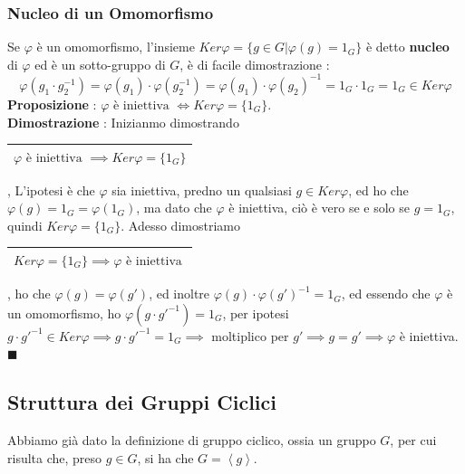 \documentclass[12pt, letterpaper]{article}
\begin{document}
\subsubsection{Nucleo di un Omomorfismo}
Se \(\varphi\) è un omomorfismo, l'insieme \(Ker\varphi=\{g\in G|\varphi(g)=1_G\}\) è detto \textbf{nucleo} di 
\(\varphi\) ed è un sotto-gruppo di \(G\), è di facile dimostrazione : 
\begin{equation}
    \varphi(g_1\cdot g_2^{-1})=\varphi(g_1)\cdot\varphi(g_2^{-1})=\varphi(g_1)\cdot\varphi(g_2)^{-1}
    =1_G\cdot 1_G = 1_G \in Ker\varphi
\end{equation}
\textbf{Proposizione }: \(\varphi\text{ è iniettiva }\iff Ker\varphi=\{1_G\}\).\\
\textbf{Dimostrazione }: Inizianmo dimostrando 
\begin{tabular}{|c|}
    \hline
    \(\varphi\text{ è iniettiva }\implies Ker\varphi=\{1_G\}\) \\ \hline
    \end{tabular}
, 
L'ipotesi è che \(\varphi\) sia iniettiva, predno un qualsiasi \(g\in Ker\varphi\), ed ho che 
\(\varphi(g)=1_G=\varphi(1_G)\), ma dato che \(\varphi\) è iniettiva, ciò è vero se e 
solo se \(g=1_G\), quindi \(Ker\varphi=\{1_G\}\). Adesso 
dimostriamo \begin{tabular}{|c|}
    \hline
    \(Ker\varphi=\{1_G\}\implies \varphi\text{ è iniettiva }\) \\ \hline
    \end{tabular}, ho che \(\varphi(g)=\varphi(g')\), ed inoltre 
    \(\varphi(g)\cdot \varphi(g')^{-1}=1_G\), ed essendo che \(\varphi\) è un 
    omomorfismo, ho  \(\varphi(g\cdot g'^{-1})=1_G\), per ipotesi \(g\cdot g'^{-1}\in Ker\varphi
    \implies g\cdot g'^{-1}=1_G\implies\) moltiplico per \(g'\implies g=g'\implies \varphi\) è iniettiva. \(\blacksquare\)
\subsection{Struttura dei Gruppi Ciclici}    
Abbiamo già dato la definizione di gruppo ciclico, ossia un gruppo \(G\), per cui risulta che,
preso \(g\in G\), si ha che \(G=\left\langle g\right\rangle\).\\
\end{document}
